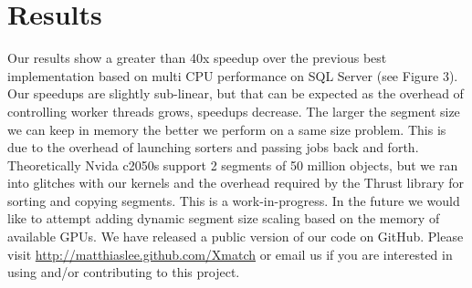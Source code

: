 \section{Results}
Our results show a greater than 40x speedup over the previous best implementation based on multi CPU performance on SQL Server (see Figure 3). Our speedups are slightly sub-linear, but that can be expected as the overhead of controlling worker threads grows, speedups decrease. The larger the segment size we can keep in memory the better we perform on a same size problem. This is due to the overhead of launching sorters and passing jobs back and forth. Theoretically Nvida c2050s support 2 segments of 50 million objects, but we ran into glitches with our kernels and the overhead required by the Thrust library for sorting and copying segments. This is a work-in-progress. In the future we would like to attempt adding dynamic segment size scaling based on the memory of available GPUs. We have released a public version of our code on GitHub. Please visit \url{http://matthiaslee.github.com/Xmatch} or email us if you are interested in using and/or contributing to this project.



